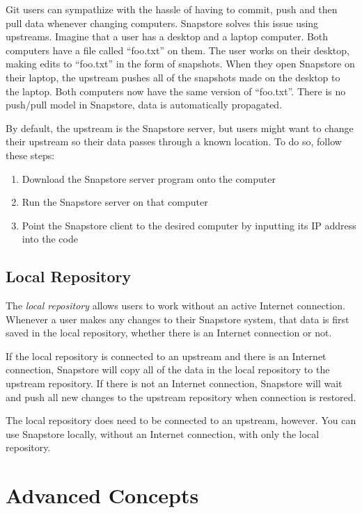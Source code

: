 Git users can sympathize with the hassle of having to commit, push and then pull data whenever changing computers. Snapstore solves this issue using upstreams. Imagine that a user has a desktop and a laptop computer. Both computers have a file called ``foo.txt'' on them. The user works on their desktop, making edits to ``foo.txt'' in the form of snapshots. When they open Snapstore on their laptop, the upstream pushes all of the snapshots made on the desktop to the laptop. Both computers now have the same version of ``foo.txt''. There is no push/pull model in Snapstore, data is automatically propagated.

By default, the upstream is the Snapstore server, but users might want to change their upstream so their data passes through a known location. To do so, follow these steps:
\begin{enumerate}
  \item{Download the Snapstore server program onto the computer}
  \item{Run the Snapstore server on that computer}
  \item{Point the Snapstore client to the desired computer by inputting its IP address into the code}
\end{enumerate}

\subsection{Local Repository}

The \textit{local repository} allows users to work without an active Internet connection. Whenever a user makes any changes to their Snapstore system, that data is first saved in the local repository, whether there is an Internet connection or not. 

If the local repository is connected to an upstream and there is an Internet connection, Snapstore will copy all of the data in the local repository to the upstream repository. If there is not an Internet connection, Snapstore will wait and push all new changes to the upstream repository when connection is restored.

The local repository does need to be connected to an upstream, however. You can use Snapstore locally, without an Internet connection, with only the local repository.

\section{Advanced Concepts}


